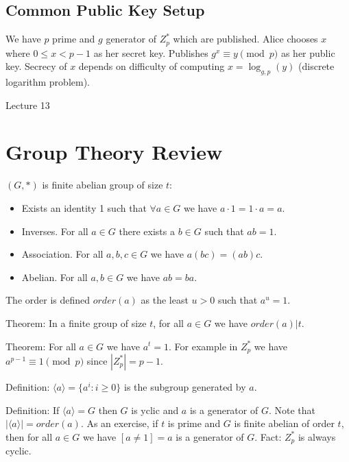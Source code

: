 \documentclass[psamsfonts]{amsart}
\begin{document}
\subsection{Common Public Key Setup}

We have $p$ prime and $g$ generator of $Z_{p}^*$ which are published. Alice chooses $x$ where $0 \leq x < p-1$ as her secret key. Publishes $g^{x} \equiv y \pmod{p}$ as her public key. Secrecy of $x$ depends on difficulty of computing $x = \log_{g,p} (y)$ (discrete logarithm problem).


\newpage
\Large{Lecture 13}


\maketitle

\section{Group Theory Review}

$(G,*)$ is finite abelian group of size $t$:
\begin{itemize}
  \item Exists an identity 1 such that $\forall a \in G$ we have $a \cdot 1 = 1 \cdot a = a$.
  \item Inverses. For all $a \in G$ there exists a $b \in G$ such that $ab = 1$.
  \item Association. For all $a,b,c \in G$ we have $a (bc) = (ab) c$.
  \item Abelian. For all $a,b \in G$ we have $ab = ba$.
\end{itemize}

The order is defined $order(a)$ as the least $u > 0$ such that $a^u = 1$.

Theorem: In a finite group of size $t$, for all $a \in G$ we have $order(a) | t$.

Theorem: For all $a \in G$ we have $a^t = 1$. For example in $Z_p^*$ we have $a^{p-1} \equiv 1 \pmod{p}$ since $|Z_{p}^*| = p-1$.

Definition: $\langle a \rangle = \{a^i : i \geq 0\}$ is the subgroup generated by $a$.

Definition: If $\langle a \rangle = G$ then $G$ is yclic and $a$ is a generator of $G$. Note that $| \langle a \rangle | = order(a)$. As an exercise, if $t$ is prime and $G$ is finite abelian of order $t$, then for all $a \in G$ we have $[a \neq 1] = a$ is a generator of $G$. Fact: $Z_{p}^*$ is always cyclic.
\end{document}
